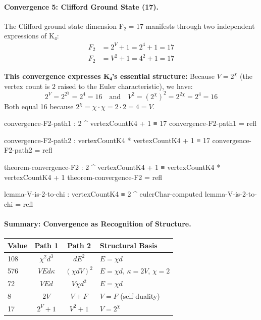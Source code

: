 \documentclass[11pt,a4paper]{book}
\begin{document}
\paragraph{Convergence 5: Clifford Ground State (17).}

The Clifford ground state dimension F₂ = 17 manifests through two independent expressions of K₄:
\begin{align}
F_2 &= 2^V + 1 = 2^4 + 1 = 17 \\
F_2 &= V^2 + 1 = 4^2 + 1 = 17
\end{align}

\textbf{This convergence expresses K₄'s essential structure:} Because $V = 2^\chi$ (the vertex count is $2$ raised to
the Euler characteristic), we have:
\[
2^V = 2^{2^\chi} = 2^4 = 16 \quad \text{and} \quad V^2 = (2^\chi)^2 = 2^{2\chi} = 2^4 = 16
\]
Both equal 16 because $2^\chi = \chi \cdot \chi = 2 \cdot 2 = 4 = V$.

\begin{code}
convergence-F2-path1 : 2 ^ vertexCountK4 + 1 ≡ 17
convergence-F2-path1 = refl

convergence-F2-path2 : vertexCountK4 * vertexCountK4 + 1 ≡ 17
convergence-F2-path2 = refl

theorem-convergence-F2 : 2 ^ vertexCountK4 + 1 ≡ vertexCountK4 * vertexCountK4 + 1
theorem-convergence-F2 = refl

lemma-V-is-2-to-chi : vertexCountK4 ≡ 2 ^ eulerChar-computed
lemma-V-is-2-to-chi = refl
\end{code}

\paragraph{Summary: Convergence as Recognition of Structure.}

\begin{center}
\begin{tabular}{|l|c|c|l|}
\hline
\textbf{Value} & \textbf{Path 1} & \textbf{Path 2} & \textbf{Structural Basis} \\
\hline
108 & $\chi^2 d^3$ & $d E^2$ & $E = \chi d$ \\
576 & $V E d \kappa$ & $(\chi d V)^2$ & $E = \chi d$, $\kappa = 2V$, $\chi = 2$ \\
72 & $V E d$ & $V \chi d^2$ & $E = \chi d$ \\
8 & $2V$ & $V + F$ & $V = F$ (self-duality) \\
17 & $2^V + 1$ & $V^2 + 1$ & $V = 2^\chi$ \\
\hline
\end{tabular}
\end{center}
\end{document}
